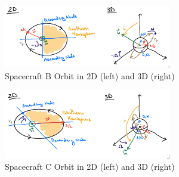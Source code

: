 \begin{hwkProblem}{4}{}
	\hwkPart

	\begin{figure}[H]
		\begin{center}
			\includegraphics[width=0.65\textwidth]{./images/s04b.png}
		\end{center}
		\caption{Spacecraft B Orbit in 2D (left) and 3D (right)}\label{fig:s04b}
	\end{figure}

	\hwkPart

	\begin{figure}[H]
		\begin{center}
			\includegraphics[width=0.65\textwidth]{./images/s04c.png}
		\end{center}
		\caption{Spacecraft C Orbit in 2D (left) and 3D (right)}\label{fig:s04c}
	\end{figure}

\end{hwkProblem}
